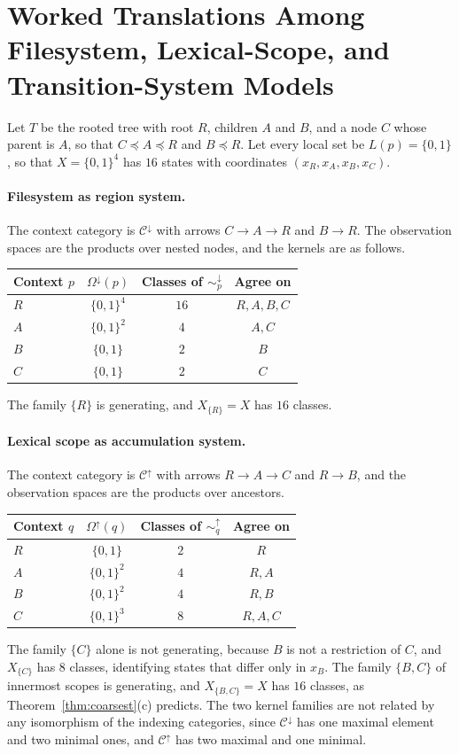 \documentclass[11pt]{article}
\theoremstyle{definition}
\theoremstyle{remark}
\newcommand{\cC}{\mathcal C}
\newcommand{\sk}{\sim}
\begin{document}
\section{Worked Translations Among Filesystem, Lexical-Scope, and Transition-System Models}

Let $T$ be the rooted tree with root $R$, children $A$ and $B$, and a node $C$ whose parent is $A$, so that $C\preceq A\preceq R$ and $B\preceq R$. Let every local set be $L(p)=\{0,1\}$, so that $X=\{0,1\}^4$ has $16$ states with coordinates $(x_R,x_A,x_B,x_C)$.

\paragraph{Filesystem as region system.} The context category is $\cC^{\downarrow}$ with arrows $C\to A\to R$ and $B\to R$. The observation spaces are the products over nested nodes, and the kernels are as follows.
\begin{center}
\begin{tabular}{lccc}
\toprule
Context $p$ & $\Omega^{\downarrow}(p)$ & Classes of $\sk^{\downarrow}_p$ & Agree on\\
\midrule
$R$ & $\{0,1\}^4$ & $16$ & $R,A,B,C$\\
$A$ & $\{0,1\}^2$ & $4$ & $A,C$\\
$B$ & $\{0,1\}$ & $2$ & $B$\\
$C$ & $\{0,1\}$ & $2$ & $C$\\
\bottomrule
\end{tabular}
\end{center}
The family $\{R\}$ is generating, and $X_{\{R\}}=X$ has $16$ classes.

\paragraph{Lexical scope as accumulation system.} The context category is $\cC^{\uparrow}$ with arrows $R\to A\to C$ and $R\to B$, and the observation spaces are the products over ancestors.
\begin{center}
\begin{tabular}{lccc}
\toprule
Context $q$ & $\Omega^{\uparrow}(q)$ & Classes of $\sk^{\uparrow}_q$ & Agree on\\
\midrule
$R$ & $\{0,1\}$ & $2$ & $R$\\
$A$ & $\{0,1\}^2$ & $4$ & $R,A$\\
$B$ & $\{0,1\}^2$ & $4$ & $R,B$\\
$C$ & $\{0,1\}^3$ & $8$ & $R,A,C$\\
\bottomrule
\end{tabular}
\end{center}
The family $\{C\}$ alone is not generating, because $B$ is not a restriction of $C$, and $X_{\{C\}}$ has $8$ classes, identifying states that differ only in $x_B$. The family $\{B,C\}$ of innermost scopes is generating, and $X_{\{B,C\}}=X$ has $16$ classes, as Theorem~\ref{thm:coarsest}(c) predicts. The two kernel families are not related by any isomorphism of the indexing categories, since $\cC^{\downarrow}$ has one maximal element and two minimal ones, and $\cC^{\uparrow}$ has two maximal and one minimal.
\end{document}
